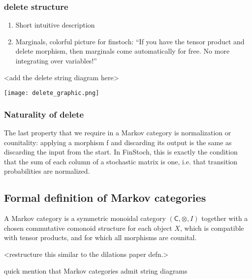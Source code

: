 \begin{frame}
    \frametitle{delete structure}
    \begin{minipage}{.48\textwidth}
        \begin{enumerate}
            \item Short intuitive description
            \item Marginals, colorful picture for finstoch: “If you have the tensor product and delete morphism, then marginals come automatically for free. No more integrating over variables!”
        \end{enumerate}
        <add the delete string diagram here>
    \end{minipage}
    \hfill
    \begin{minipage}{.48\textwidth}
        \texttt{[image: delete\_graphic.png]}
    \end{minipage}
\end{frame}

\begin{frame}
    \frametitle{Naturality of delete}
The last property that we require in a Markov category is normalization or counitality: applying a morphism f and discarding its output is the same as discarding the input from the start.  In FinStoch, this is exactly the condition that the sum of each column of a stochastic matrix is one, i.e. that transition probabilities are normalized.
\end{frame}

\subsection{Formal definition of Markov categories}

\begin{frame}
    \begin{definition}
        A Markov category is a symmetric monoidal category $(\mathsf{C}, \otimes, I)$ together with a chosen commutative comonoid structure for each object $X$, which is compatible with tensor products, and for which all morphisms are counital.
    \end{definition}
    <restructure this similar to the dilations paper defn.>
\end{frame}

\begin{frame} %
    quick mention that Markov categories admit string diagrams
\end{frame}
